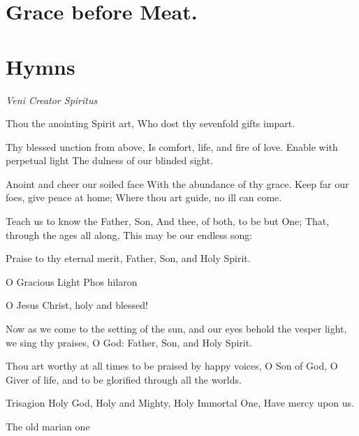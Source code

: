 \section{Grace before Meat.}



\fleuron

\section{Hymns}

\centerline{\itshape Veni Creator Spiritus}
{\obeylines
{}
Thou the anointing Spirit art, 
Who dost thy sevenfold gifts impart.

\medskip
Thy blessed unction from above, 
Is comfort, life, and fire of love.
Enable with perpetual light 
The dulness of our blinded sight.


\medskip
Anoint and cheer our soiled face 
With the abundance of thy grace. 
Keep far our foes, give peace at home; 
Where thou art guide, no ill can come.


\medskip
Teach us to know the Father, Son, 
And thee, of both, to be but One; 
That, through the ages all along, 
This may be our endless song:


\medskip
    Praise to thy eternal merit, 
    Father, Son, and Holy Spirit.
}

\bigskip
O Gracious Light Phos hilaron
{\obeylines
{}
O Jesus Christ, holy and blessed!

\medskip
Now as we come to the setting of the sun,
and our eyes behold the vesper light,
we sing thy praises, O God: Father, Son, and Holy Spirit.

\medskip
Thou art worthy at all times to be praised by happy voices,
O Son of God, O Giver of life,
and to be glorified through all the worlds.
}
\bigskip
Trisagion
{\obeylines
Holy God,
Holy and Mighty,
Holy Immortal One,
Have mercy upon us.
}

The old marian one
